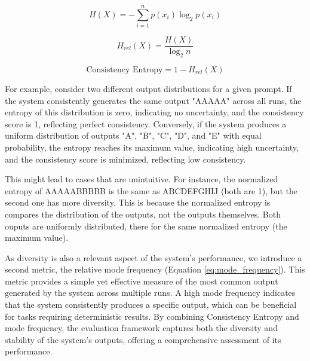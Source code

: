 \begin{equation}
    H(X) = - \sum_{i=1}^{n} p(x_i) \log_2 p(x_i)
    \label{eq:entropy}
\end{equation}

\begin{equation}
    H_{rel}(X) = \frac{H(X)}{\log_2 n} 
    \label{eq:norm_entropy}
\end{equation}

\begin{equation}
    \text{Consistency Entropy} = 1 - H_{rel}(X)
    \label{eq:consistency_entropy}
\end{equation}



For example, consider two different output distributions for a given prompt. If the system consistently generates the same output "AAAAA" across all runs, the entropy of this distribution is zero, indicating no uncertainty, and the consistency score is 1, reflecting perfect consistency. Conversely, if the system produces a uniform distribution of outputs "A", "B", "C", "D", and "E" with equal probability, the entropy reaches its maximum value, indicating high uncertainty, and the consistency score is minimized, reflecting low consistency.

This might lead to cases that are unintuitive. For instance, the normalized entropy of AAAAABBBBB is the same as ABCDEFGHIJ (both are 1), but the second one has more diversity. This is because the normalized entropy is compares the distribution of the outputs, not the outputs themselves. Both ouputs are uniformly distributed, there for the same normalized entropy (the maximum value).

As diversity is also a relevant aspect of the system's performance, we introduce a second metric, the relative mode frequency (Equation \ref{eq:mode_frequency}). This metric provides a simple yet effective measure of the most common output generated by the system across multiple runs. A high mode frequency indicates that the system consistently produces a specific output, which can be beneficial for tasks requiring deterministic results. By combining Consistency Entropy and mode frequency, the evaluation framework captures both the diversity and stability of the system's outputs, offering a comprehensive assessment of its performance.

